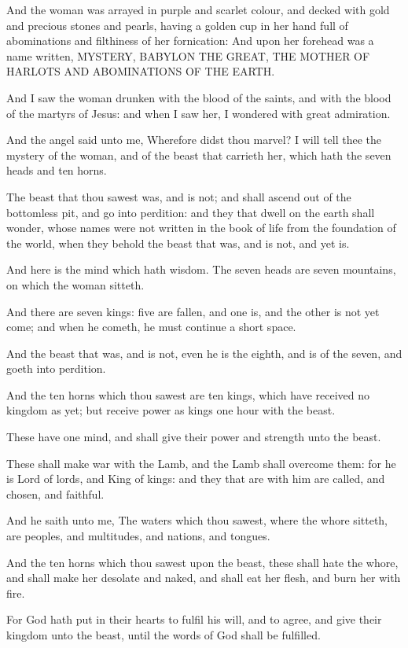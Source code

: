 \verse And the woman was arrayed in purple and scarlet colour, and decked with gold and precious stones and pearls, having a golden cup in her hand full of abominations and filthiness of her fornication: \verse And upon her forehead was a name written, MYSTERY, BABYLON THE GREAT, THE MOTHER OF HARLOTS AND ABOMINATIONS OF THE EARTH.

\verse And I saw the woman drunken with the blood of the saints, and with the blood of the martyrs of Jesus: and when I saw her, I wondered with great admiration.

\verse And the angel said unto me, Wherefore didst thou marvel? I will tell thee the mystery of the woman, and of the beast that carrieth her, which hath the seven heads and ten horns.

\verse The beast that thou sawest was, and is not; and shall ascend out of the bottomless pit, and go into perdition: and they that dwell on the earth shall wonder, whose names were not written in the book of life from the foundation of the world, when they behold the beast that was, and is not, and yet is.

\verse And here is the mind which hath wisdom. The seven heads are seven mountains, on which the woman sitteth.

\verse And there are seven kings: five are fallen, and one is, and the other is not yet come; and when he cometh, he must continue a short space.

\verse And the beast that was, and is not, even he is the eighth, and is of the seven, and goeth into perdition.

\verse And the ten horns which thou sawest are ten kings, which have received no kingdom as yet; but receive power as kings one hour with the beast.

\verse These have one mind, and shall give their power and strength unto the beast.

\verse These shall make war with the Lamb, and the Lamb shall overcome them: for he is Lord of lords, and King of kings: and they that are with him are called, and chosen, and faithful.

\verse And he saith unto me, The waters which thou sawest, where the whore sitteth, are peoples, and multitudes, and nations, and tongues.

\verse And the ten horns which thou sawest upon the beast, these shall hate the whore, and shall make her desolate and naked, and shall eat her flesh, and burn her with fire.

\verse For God hath put in their hearts to fulfil his will, and to agree, and give their kingdom unto the beast, until the words of God shall be fulfilled.

